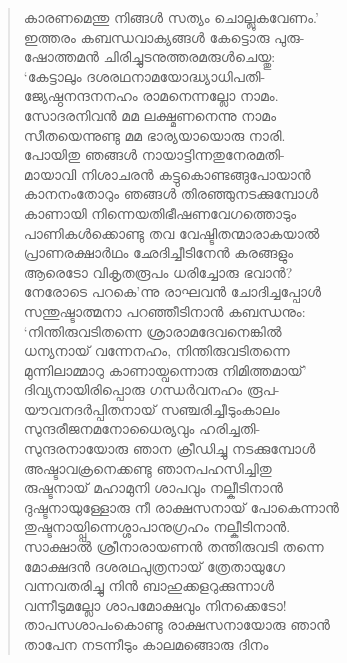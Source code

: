 \begin{verse}
കാരണമെന്തു നിങ്ങള്‍ സത്യം ചൊല്ലുകവേണം.’\\
ഇത്തരം കബന്ധവാക്യങ്ങള്‍ കേട്ടൊരു പുരു-\\
ഷോത്തമന്‍ ചിരിച്ചുടനുത്തരമരുള്‍ചെയ്തു:\\
‘കേട്ടാലും ദശരഥനാമയോദ്ധ്യാധിപതി-\\
ജ്യേഷ്ഠനന്ദനനഹം രാമനെന്നല്ലോ നാമം.\\
സോദരനിവന്‍ മമ ലക്ഷ്മണനെന്നു നാമം\\
സീതയെന്നുണ്ടു മമ ഭാര്യയായൊരു നാരി.\\
പോയിതു ഞങ്ങള്‍ നായാട്ടിന്നതുനേരമതി-\\
മായാവി നിശാചരന്‍ കട്ടുകൊണ്ടങ്ങുപോയാന്‍\\
കാനനംതോറും ഞങ്ങള്‍ തിരഞ്ഞുനടക്കുമ്പോള്‍\\
കാണായി നിന്നെയതിഭീഷണവേഗത്തൊടും\\
പാണികള്‍ക്കൊണ്ടു തവ വേഷ്ടിതന്മാരാകയാല്‍\\
പ്രാണരക്ഷാര്‍ഥം ഛേദിച്ചീടിനേന്‍ കരങ്ങളും\\
ആരെടോ വികൃതരൂപം ധരിച്ചോരു ഭവാന്‍?\\
നേരോടെ പറകെ’ന്നു രാഘവന്‍ ചോദിച്ചപ്പോള്‍\\
സന്തുഷ്ടാത്മനാ പറഞ്ഞീടിനാന്‍ കബന്ധനും:\\
‘നിന്തിരുവടിതന്നെ ശ്രാരാമദേവനെങ്കില്‍\\
ധന്യനായ് വന്നേനഹം, നിന്തിരുവടിതന്നെ\\
മുന്നിലാമ്മാറു കാണായ്വന്നൊരു നിമിത്തമായ്’\\
ദിവ്യനായിരിപ്പൊരു ഗന്ധര്‍വനഹം രൂപ-\\
യൗവനദര്‍പ്പിതനായ് സഞ്ചരിച്ചീടുംകാലം\\
സുന്ദരീജനമനോധൈര്യവും ഹരിച്ചതി-\\
സുന്ദരനായോരു ഞാന‍ ക്രീഡിച്ചു നടക്കുമ്പോള്‍\\
അഷ്ടാവക്രനെക്കണ്ടു ഞാനപഹസിച്ചിതു\\
രുഷ്ടനായ് മഹാമുനി ശാപവും നല്കീടിനാന്‍\\
ദുഷ്ടനായുള്ളോരു നീ രാക്ഷസനായ് പോകെന്നാന്‍\\
തുഷ്ടനായ്പ്പിന്നെശ്ശാപാനുഗ്രഹം നല്കീടിനാന്‍.\\
സാക്ഷാല്‍ ശ്രീനാരായണന്‍ തന്തിരുവടി തന്നെ\\
മോക്ഷദന്‍ ദശരഥപുത്രനായ് ത്രേതായുഗേ\\
വന്നവതരിച്ചു നിന്‍ ബാഹുക്കളറുക്കുന്നാള്‍\\
വന്നീടുമല്ലോ ശാപമോക്ഷവും നിനക്കെടോ!\\
താപസശാപംകൊണ്ടു രാക്ഷസനായോരു ഞാന്‍\\
താപേന നടന്നീടും കാലമങ്ങൊരു ദിനം\\

\end{verse}
